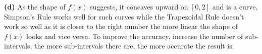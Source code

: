 \textbf{(d)} As the shape of $f(x)$ suggests, it concaves upward on $[0, 2]$ and is a curve. Simpson's Rule works well for such curves while the Trapezoidal Rule doesn't work so well as it is closer to the right number the more linear the shape of $f(x)$ looks and vice versa. To improve the accuracy, increase the number of sub-intervals, the more sub-intervals there are, the more accurate the result is.

\pagebreak
